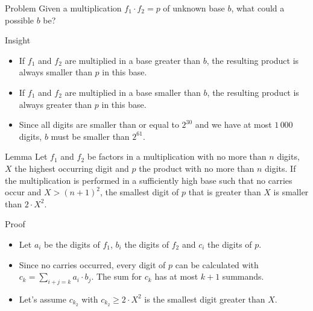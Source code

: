 \begin{slide}
  \begin{block}{Problem}
    Given a multiplication $f_1 \cdot f_2 = p$ of unknown base $b$, what could a possible $b$ be?
  \end{block}
  \pause
  \begin{block}{Insight}
    \begin{itemize}
      \item If $f_1$ and $f_2$ are multiplied in a base greater than $b$, the resulting product
        is always smaller than $p$ in this base.
      \item If $f_1$ and $f_2$ are multiplied in a base smaller than $b$, the resulting product
        is always greater than $p$ in this base.
      \item Since all digits are smaller than or equal to $2^{30}$ and we have at most $1\,000$
        digits, $b$ must be smaller than $2^{61}$.
    \end{itemize}
  \end{block}
\end{slide}
\begin{slide}
  \begin{block}{Lemma}
    Let $f_1$ and $f_2$ be factors in a multiplication with no more than $n$ digits, $X$ the
    highest occurring digit and $p$ the product with no more than $n$ digits. If the
    multiplication is performed in a sufficiently high base such that no carries occur and
    $X > (n + 1)^{2}$, the smallest digit of $p$ that is greater than $X$ is smaller
    than $2 \cdot X^{2}$.
  \end{block}
  \pause
  \begin{block}{Proof}
    \begin{itemize}
      \item Let $a_i$ be the digits of $f_1$, $b_i$ the digits of $f_2$ and $c_i$ the digits of $p$.
      \item Since no carries occurred, every digit of $p$ can be calculated with
        $c_k = \sum_{i + j = k} a_i \cdot b_j$. The sum for $c_k$ has at most $k + 1$ summands.
      \item Let's assume $c_{k_2}$ with $c_{k_2} \ge 2 \cdot X^{2}$ is the smallest digit greater than $X$.
    \end{itemize}
  \end{block}
\end{slide}
